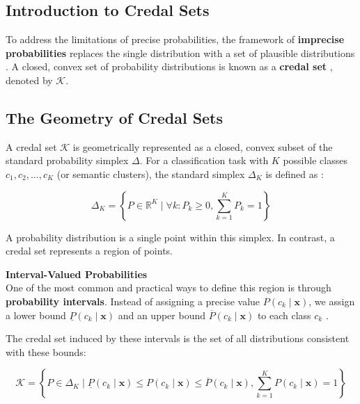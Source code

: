 \subsection{Introduction to Credal Sets}
\label{sec:background:credal_sets:intro}
To address the limitations of precise probabilities, the framework of
\textbf{imprecise probabilities} replaces the single distribution
with a set of plausible distributions
\parencite{Levi1980-LEVTEO-7, Walley1991-WALSRW}.
A closed, convex set of probability distributions is known as a 
\textbf{credal set} \parencite{COZMAN2000199}, denoted by 
$\mathcal{K}$. 


\subsection{The Geometry of Credal Sets}
\label{sec:background:credal_sets:geometry}
A credal set $\mathcal{K}$ is geometrically represented as a closed, 
convex subset of the standard probability simplex $\Delta$. 
For a classification task with $K$ possible classes 
$c_1, c_2, \dots, c_K$ (or semantic clusters), 
the standard simplex $\Delta_K$ is defined as
\parencite{https://doi.org/10.1002/bimj.4710300705}:

\begin{equation}
    \Delta_K = \left\{ P \in \mathbb{R}^K \mid 
	\forall k: P_k \geq 0, \sum_{k=1}^K P_k = 1
	\right\} 
    \label{eq:simplex}
\end{equation}

A probability distribution is a single point within this simplex. 
In contrast, a credal set represents a region of points.

\textbf{Interval-Valued Probabilities} \\
One of the most common and practical ways to define this region is  
through \textbf{probability intervals}. Instead of assigning a precise
value $P(c_k \mid \mathbf{x})$, we assign a lower bound $\underline{P}(c_k \mid \mathbf{x})$ and an
upper bound $\overline{P}(c_k \mid \mathbf{x})$ to each class $c_k$
\parencite{article}.

The credal set induced by these intervals is the set of all 
distributions consistent with these bounds:

\begin{equation}
    \mathcal{K} = \left\{ P \in \Delta_K \mid \underline{P} (c_k \mid \mathbf{x}) 
	\leq P(c_k \mid \mathbf{x}) \leq \overline{P}(c_k \mid \mathbf{x}), \sum_{k=1}^{K} P(c_k \mid \mathbf{x}) = 1 
	\right\}
    \label{eq:probability_interval_credal_set}
\end{equation}

